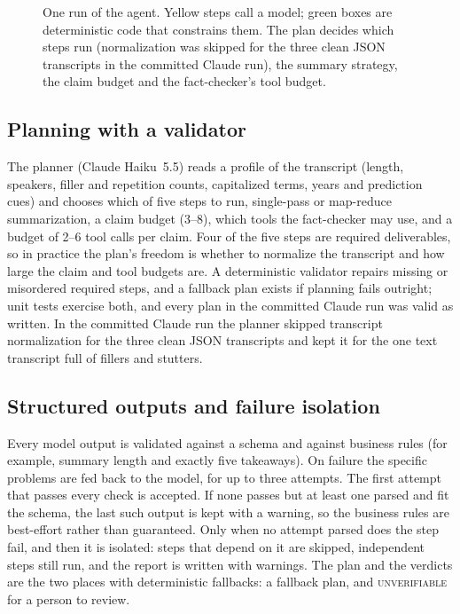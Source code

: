 \documentclass[11pt]{article}
\newcommand{\U}{\textsc{unverifiable}}
\begin{document}
\begin{figure}[t]
\caption{One run of the agent. Yellow steps call a model; green boxes are deterministic code that constrains them. The plan decides which steps run (normalization was skipped for the three clean JSON transcripts in the committed Claude run), the summary strategy, the claim budget and the fact-checker's tool budget.}\label{fig:pipeline}
\end{figure}

\subsection{Planning with a validator}\label{sec:plan}
The planner (Claude Haiku~5.5) reads a profile of the transcript (length, speakers, filler and repetition counts, capitalized terms, years and prediction cues) and chooses which of five steps to run, single-pass or map-reduce summarization, a claim budget (3--8), which tools the fact-checker may use, and a budget of 2--6 tool calls per claim. Four of the five steps are required deliverables, so in practice the plan's freedom is whether to normalize the transcript and how large the claim and tool budgets are. A deterministic validator repairs missing or misordered required steps, and a fallback plan exists if planning fails outright; unit tests exercise both, and every plan in the committed Claude run was valid as written. In the committed Claude run the planner skipped transcript normalization for the three clean JSON transcripts and kept it for the one text transcript full of fillers and stutters.

\subsection{Structured outputs and failure isolation}
Every model output is validated against a schema and against business rules (for example, summary length and exactly five takeaways). On failure the specific problems are fed back to the model, for up to three attempts. The first attempt that passes every check is accepted. If none passes but at least one parsed and fit the schema, the last such output is kept with a warning, so the business rules are best-effort rather than guaranteed. Only when no attempt parsed does the step fail, and then it is isolated: steps that depend on it are skipped, independent steps still run, and the report is written with warnings. The plan and the verdicts are the two places with deterministic fallbacks: a fallback plan, and \U{} for a person to review.
\end{document}
